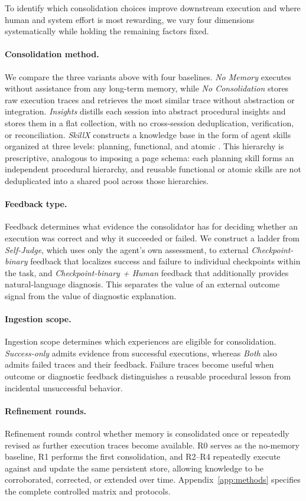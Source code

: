 To identify which consolidation choices improve downstream execution and where
human and system effort is most rewarding, we vary four dimensions
systematically while holding the remaining factors fixed.

\paragraph{Consolidation method.}
We compare the three \method{} variants above with four baselines. \emph{No
Memory} executes without assistance from any long-term memory, while \emph{No
Consolidation} stores raw execution traces and retrieves the most similar trace
without abstraction or integration. \emph{Insights} distills each session into
abstract procedural insights \citep{insights} and stores them in a flat
collection, with no cross-session deduplication, verification, or
reconciliation. \emph{SkillX} constructs a knowledge base in the form of agent
skills organized at three levels: planning, functional, and atomic
\citep{skillx}. This hierarchy is prescriptive, analogous to imposing a page
schema: each planning skill forms an independent procedural hierarchy, and
reusable functional or atomic skills are not deduplicated into a shared pool
across those hierarchies.

\paragraph{Feedback type.}
Feedback determines what evidence the consolidator has for deciding whether an
execution was correct and why it succeeded or failed. We construct a ladder
from \emph{Self-Judge}, which uses only the agent's own assessment, to external
\emph{Checkpoint-binary} feedback that localizes success and failure to
individual checkpoints within the task, and \emph{Checkpoint-binary + Human}
feedback that additionally provides natural-language diagnosis. This separates
the value of an external outcome signal from the value of diagnostic
explanation.

\paragraph{Ingestion scope.}
Ingestion scope determines which experiences are eligible for consolidation.
\emph{Success-only} admits evidence from successful executions, whereas
\emph{Both} also admits failed traces and their feedback. Failure traces become
useful when outcome or diagnostic feedback distinguishes a reusable procedural
lesson from incidental unsuccessful behavior.

\paragraph{Refinement rounds.}
Refinement rounds control whether memory is consolidated once or repeatedly
revised as further execution traces become available. R0 serves as the
no-memory baseline, R1 performs the first consolidation, and R2--R4 repeatedly
execute against and update the same persistent store, allowing knowledge to be
corroborated, corrected, or extended over time. Appendix~\ref{app:methods}
specifies the complete controlled matrix and protocols.




